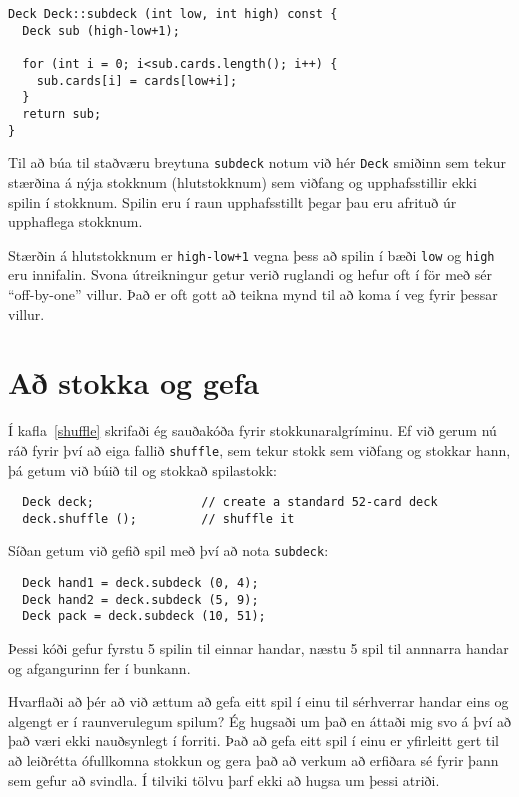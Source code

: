 \begin{verbatim}
Deck Deck::subdeck (int low, int high) const {
  Deck sub (high-low+1);
	
  for (int i = 0; i<sub.cards.length(); i++) {
    sub.cards[i] = cards[low+i];
  }
  return sub;
}
\end{verbatim}
%
Til að búa til staðværu breytuna {\tt subdeck} notum við hér {\tt Deck} smiðinn sem tekur stærðina á nýja stokknum (hlutstokknum)
sem viðfang og upphafsstillir ekki spilin í stokknum.
Spilin eru í raun upphafsstillt þegar þau eru afrituð úr upphaflega stokknum.

Stærðin á hlutstokknum er {\tt high-low+1} vegna þess að spilin í bæði {\tt low} og {\tt high} eru innifalin.
Svona útreikningur getur verið ruglandi og hefur oft í för með sér ``off-by-one'' villur.
Það er oft gott að teikna mynd til að koma í veg fyrir þessar villur.



\section{Að stokka og gefa}

Í kafla~\ref{shuffle} skrifaði ég sauðakóða fyrir stokkunaralgríminu.
Ef við gerum nú ráð fyrir því að eiga fallið {\tt shuffle}, sem tekur stokk sem viðfang og stokkar hann, þá getum við búið til og stokkað spilastokk: 

\begin{verbatim}
  Deck deck;               // create a standard 52-card deck
  deck.shuffle ();         // shuffle it
\end{verbatim}
%
Síðan getum við gefið spil með því að nota {\tt subdeck}:

\begin{verbatim}
  Deck hand1 = deck.subdeck (0, 4);
  Deck hand2 = deck.subdeck (5, 9);
  Deck pack = deck.subdeck (10, 51);
\end{verbatim}
%
Þessi kóði gefur fyrstu 5 spilin til einnar handar, næstu 5 spil til annnarra handar og afgangurinn fer í bunkann.

Hvarflaði að þér að við ættum að gefa eitt spil í einu til sérhverrar handar eins og algengt er í raunverulegum spilum?
Ég hugsaði um það en áttaði mig svo á því að það væri ekki nauðsynlegt í forriti.
Það að gefa eitt spil í einu er yfirleitt gert til að leiðrétta ófullkomna stokkun og gera það að verkum að erfiðara sé fyrir þann sem gefur að svindla.
Í tilviki tölvu þarf ekki að hugsa um þessi atriði. 

